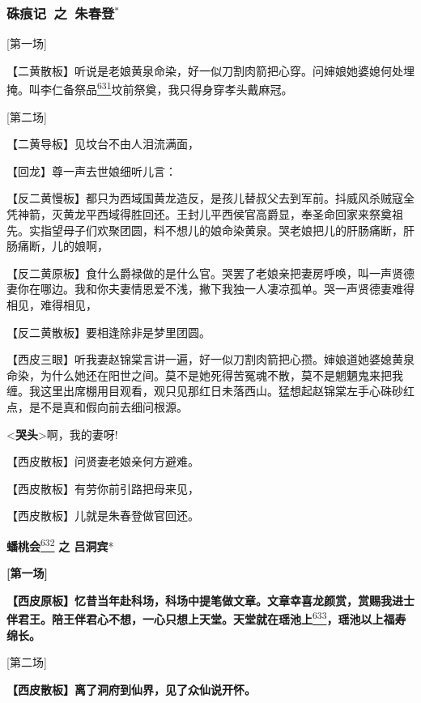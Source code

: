 \newpage
{} %
\subsubsection{{\hei\large 硃痕记~{\normalsize 之}~朱春登}$^\ast$}%

{[}第一场{]}

【二黄散板】听说是老娘黄泉命染，好一似刀割肉箭把心穿。问婶娘她婆媳何处埋掩。叫李仁备祭品\protect\hyperlink{fn631}{\textsuperscript{631}}坟前祭奠，我只得身穿孝头戴麻冠。

{[}第二场{]}

【二黄导板】见坟台不由人泪流满面，

【回龙】尊一声去世娘细听儿言：

【反二黄慢板】都只为西域国黄龙造反，是孩儿替叔父去到军前。抖威风杀贼寇全凭神箭，灭黄龙平西域得胜回还。王封儿平西侯官高爵显，奉圣命回家来祭奠祖先。实指望母子们欢聚团圆，料不想儿的娘命染黄泉。哭老娘把儿的肝肠痛断，肝肠痛断，儿的娘啊，

【反二黄原板】食什么爵禄做的是什么官。哭罢了老娘亲把妻房呼唤，叫一声贤德妻你在哪边。我和你夫妻情恩爱不浅，撇下我独一人凄凉孤单。哭一声贤德妻难得相见，难得相见，

【反二黄散板】要相逢除非是梦里团圆。

【西皮三眼】听我妻赵锦棠言讲一遍，好一似刀割肉箭把心攒。婶娘道她婆媳黄泉命染，为什么她还在阳世之间。莫不是她死得苦冤魂不散，莫不是魍魉鬼来把我缠。我这里出席棚用目观看，观只见那红日未落西山。猛想起赵锦棠左手心硃砂红点，是不是真和假向前去细问根源。

\textless{}\textbf{哭头}\textgreater{}啊，我的妻呀!

【西皮散板】问贤妻老娘亲何方避难。

【西皮散板】有劳你前引路把母来见，

【西皮散板】儿就是朱春登做官回还。

\newpage
\textbf{蟠桃会}\protect\hyperlink{fn632}{\textsuperscript{632}}
\textbf{之 吕洞宾}*

\textbf{{[}第一场{]}}

\textbf{【西皮原板】忆昔当年赴科场，科场中提笔做文章。文章幸喜龙颜赏，赏赐我进士伴君王。陪王伴君心不想，一心只想上天堂。天堂就在瑶池上}\protect\hyperlink{fn633}{\textsuperscript{633}}\textbf{，瑶池以上福寿绵长。}

{[}第二场{]}

\textbf{【西皮散板】离了洞府到仙界，见了众仙说开怀。}

